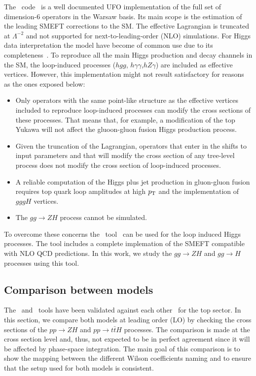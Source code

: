 The \SMEFTsim\ code~\cite{Brivio:2017btx} is a well documented UFO implementation of the full set of dimension-6 operators in the Warsaw basis. Its main scope is the estimation of the leading SMEFT corrections to the SM. The effective Lagrangian is truncated at $\Lambda^{-2}$ and not supported for next-to-leading-order (NLO) simulations. For Higgs data interpretation the model have become of common use due to its completeness~\cite{Ellis:2018gqa,ATLAS:2019jst}.  To reproduce all the main Higgs production and decay channels in the SM, the loop-induced processes ($hgg$, $h\gamma\gamma$,$hZ\gamma$) are included as effective vertices. However, this implementation might not result satisfactory for reasons as the ones exposed below:
\begin{itemize}
\item Only operators with the same point-like structure as the effective vertices included to reproduce loop-induced processes can modify the cross sections of these processes. That means that, for example, a modification of the top Yukawa will not affect the gluoon-gluon fusion Higgs production process.
\item Given the truncation of the Lagrangian, operators that enter in the shifts to input parameters and that will modify the cross section of any tree-level process does not modify the cross section of loop-induced processes.
\item A reliable computation of the Higgs plus jet  production in gluon-gluon fusion requires top quark loop amplitudes at high $p_{\textrm T}$ and the implementation of $gggH$ vertices.
\item The $gg\to ZH$ process cannot be simulated.
\end{itemize}

To overcome these concerns the \SMEFTatNLO\ tool~\cite{SMEFTNLO} can be used for the loop induced Higgs processes. The tool includes a complete implemation of the SMEFT compatible with NLO QCD predictions. In this work, we study the $gg\to ZH$ and $gg\to H$ processes using this tool. 







\subsection{Comparison between models}
\label{sec:higgseft:section2}
The \SMEFTsim\ and \SMEFTatNLO\ tools have been validated against each other~\cite{Durieux:2019lnv} for the top sector. In this section, we compare both models at leading order (LO) by checking the cross sections of the $pp\to ZH$ and $pp\to t\bar{t}H$ processes. The comparison is made at the cross section level and, thus, not expected to be in perfect agreement since it will be affected by phase-space integration. The main goal of this comparison is to show the mapping between the different Wilson coefficients naming and to ensure that the setup used for both models is consistent.

